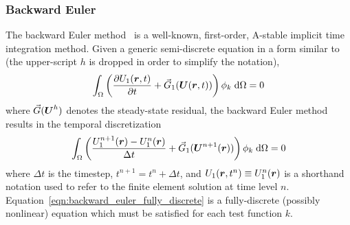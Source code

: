 \subsubsection{Backward Euler}\label{sec:backward_euler}
%
The backward Euler method~\cite{Butcher_2003} is a well-known, first-order, A-stable
implicit time integration method.  Given a generic
semi-discrete equation in a form similar to  (the upper-script $h$ is dropped in order to simplify the notation),
\begin{align}
  \int_{\Omega} \left(\frac{\partial U_1(\boldsymbol r,t)}{\partial t} + \vec{G}_1(\boldsymbol U(\boldsymbol r,t)) \right) \phi_k \; \text{d}{\Omega} = 0
\end{align}
where $\vec{G}(\boldsymbol U^h)$ denotes the steady-state residual, 
the backward Euler method results in the temporal discretization
\begin{align}
  \label{eqn:backward_euler_fully_discrete}
  \int_{\Omega} \left( \frac{U_1^{n+1}(\boldsymbol r) - U_1^n(\boldsymbol r)}{\Delta t} + \vec{G}_1(\boldsymbol U^{n+1}(\boldsymbol r)) \right) \phi_k \; \text{d}{\Omega} = 0
\end{align}
where $\Delta t$ is the timestep, $t^{n+1} = t^n + \Delta t$, and $U_1(\boldsymbol r, t^n)
\equiv U_1^n(\boldsymbol r)$ is a shorthand notation used to refer to the finite
element solution at time level
$n$. Equation~\eqref{eqn:backward_euler_fully_discrete} is a
fully-discrete (possibly nonlinear) equation which must be satisfied
for each test function $k$.

